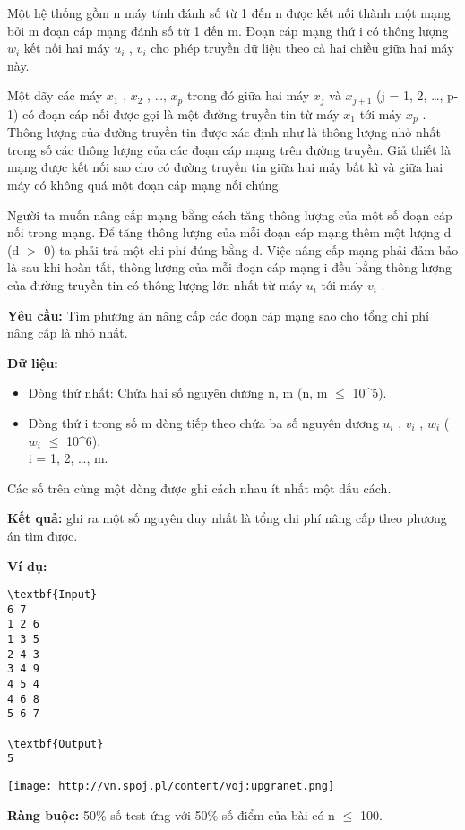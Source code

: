 

Một hệ thống gồm n máy tính đánh số từ 1 đến n được kết nối thành một mạng bởi m đoạn cáp mạng đánh số từ 1 đến m. Đoạn cáp mạng thứ i có thông lượng $w_{i}$ kết nối hai máy $u_{i}$ , $v_{i}$ cho phép truyền dữ liệu theo cả hai chiều giữa hai máy này.

Một dãy các máy $x_{1}$ , $x_{2}$ , …, $x_{p}$ trong đó giữa hai máy $x_{j}$ và $x_{j+1}$ (j = 1, 2, …, p-1) có đoạn cáp nối được gọi là một đường truyền tin từ máy $x_{1}$ tới máy $x_{p}$ . Thông lượng của đường truyền tin được xác định như là thông lượng nhỏ nhất trong số các thông lượng của các đoạn cáp mạng trên đường truyền. Giả thiết là mạng được kết nối sao cho có đường truyền tin giữa hai máy bất kì và giữa hai máy có không quá một đoạn cáp mạng nối chúng.

Người ta muốn nâng cấp mạng bằng cách tăng thông lượng của một số đoạn cáp nối trong mạng. Để tăng thông lượng của mỗi đoạn cáp mạng thêm một lượng d (d $>$ 0) ta phải trả một chi phí đúng bằng d. Việc nâng cấp mạng phải đảm bảo là sau khi hoàn tất, thông lượng của mỗi đoạn cáp mạng i đều bằng thông lượng của đường truyền tin có thông lượng lớn nhất từ máy $u_{i}$ tới máy $v_{i}$ .

\textbf{Yêu cầu: } Tìm phương án nâng cấp các đoạn cáp mạng sao cho tổng chi phí nâng cấp là nhỏ nhất.

\textbf{Dữ liệu: }
\begin{itemize}
	\item Dòng thứ nhất: Chứa hai số nguyên dương n, m (n, m  $\le$  10^5).
\end{itemize}
\begin{itemize}
	\item Dòng thứ i trong số m dòng tiếp theo chứa ba số nguyên dương $u_{i}$ , $v_{i}$ , $w_{i}$ ($w_{i}$  $\le$  10^6),
\\i = 1, 2, …, m.
\end{itemize}

Các số trên cùng một dòng được ghi cách nhau ít nhất một dấu cách.

\textbf{Kết quả: } ghi ra một số nguyên duy nhất là tổng chi phí nâng cấp theo phương án tìm được.

\textbf{Ví dụ: }\textbf{}
\begin{verbatim}
\textbf{Input}
6 7
1 2 6
1 3 5
2 4 3
3 4 9
4 5 4
4 6 8
5 6 7

\textbf{Output}
5\end{verbatim}


\texttt{[image: http://vn.spoj.pl/content/voj:upgranet.png]}

\textbf{Ràng buộc: } 50\% số test ứng với 50\% số điểm của bài có n  $\le$  100.
